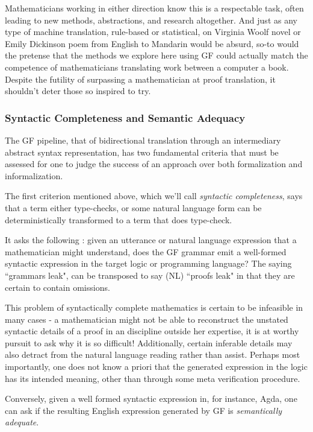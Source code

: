 Mathematicians working in either direction know this is a respectable task,
often leading to new methods, abstractions, and research altogether. And just as
any type of machine translation, rule-based or statistical, on Virginia Woolf
novel or Emily Dickinson poem from English to Mandarin would be 
absurd, so-to would the pretense that the methods we explore here using GF
could actually match the competence of mathematicians translating work between a
computer a book. Despite the futility of surpassing a mathematician at proof
translation, it shouldn't deter those so inspired to try.

\subsubsection{Syntactic Completeness and Semantic Adequacy}

The GF pipeline, that of bidirectional translation through an intermediary
abstract syntax representation, has two fundamental criteria that must be
assessed for one to judge the success of an approach over both formalization and
informalization.

The first criterion mentioned above, which we'll call \emph{syntactic
  completeness}, says that a term either type-checks, or some natural language
form can be deterministically transformed to a term that does type-check.

It asks the following : given an utterance or natural language expression that a
mathematician might understand, does the GF grammar emit a well-formed syntactic
expression in the target logic or programming language? The saying ``grammars
leak", can be transposed to say (NL) ``proofs leak" in that they are certain to
contain omissions.

This problem of syntactically complete mathematics is certain to be infeasible
in many cases - a mathematician might not be able to reconstruct the unstated
syntactic details of a proof in an discipline outside her expertise, it is at
worthy pursuit to ask why it is so difficult! Additionally, certain inferable
details may also detract from the natural language reading rather than assist.
Perhaps most importantly, one does not know a priori that the generated
expression in the logic has its intended meaning, other than through some meta
verification procedure.

Conversely, given a well formed syntactic expression in, for instance, Agda, one
can ask if the resulting English expression generated by GF is
\emph{semantically adequate}.

